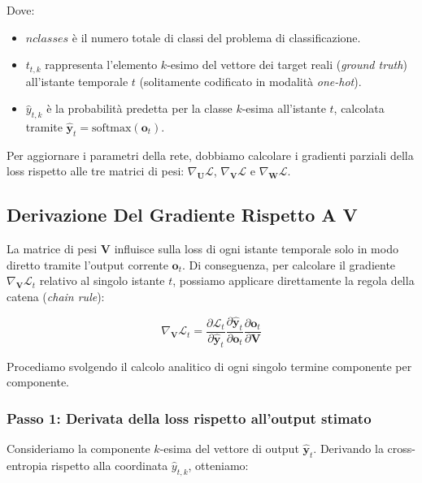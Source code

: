 ﻿\documentclass[11pt, a4paper]{article}
\begin{document}
Dove:
\begin{itemize}[noitemsep]
    \item $nclasses$ è il numero totale di classi del problema di classificazione.
    \item $t_{t,k}$ rappresenta l'elemento $k$-esimo del vettore dei target reali (\emph{ground truth}) all'istante temporale $t$ (solitamente codificato in modalità \emph{one-hot}).
    \item $\hat{y}_{t,k}$ è la probabilità predetta per la classe $k$-esima all'istante $t$, calcolata tramite $\hat{\bm{y}}_t = \text{softmax}(\bm{o}_t)$.
\end{itemize}


Per aggiornare i parametri della rete, dobbiamo calcolare i gradienti parziali della loss rispetto alle tre matrici di pesi: $\nabla_{\bm{U}}\mathcal{L}$, $\nabla_{\bm{V}}\mathcal{L}$ e $\nabla_{\bm{W}}\mathcal{L}$.

\newpage

\subsection{Derivazione Del Gradiente Rispetto A V}

La matrice di pesi $\bm{V}$ influisce sulla loss di ogni istante temporale solo in modo diretto tramite l'output corrente $\bm{o}_t$. Di conseguenza, per calcolare il gradiente $\nabla_{\bm{V}}\mathcal{L}_t$ relativo al singolo istante $t$, possiamo applicare direttamente la regola della catena (\emph{chain rule}):

\[
\nabla_{\bm{V}}\mathcal{L}_t = \frac{\partial \mathcal{L}_t}{\partial \hat{\bm{y}}_t} \frac{\partial \hat{\bm{y}}_t}{\partial \bm{o}_t} \frac{\partial \bm{o}_t}{\partial \bm{V}}
\]

Procediamo svolgendo il calcolo analitico di ogni singolo termine componente per componente.

\subsubsection{Passo 1: Derivata della loss rispetto all'output stimato}

Consideriamo la componente $k$-esima del vettore di output $\hat{\bm{y}}_t$. Derivando la cross-entropia rispetto alla coordinata $\hat{y}_{t,k}$, otteniamo:
\end{document}
